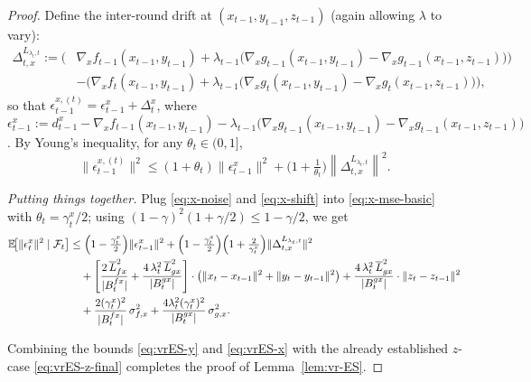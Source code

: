 \documentclass{uai2026} %
\newcommand{\EE}{\mathbb{E}}
\newcommand{\F}{\mathcal{F}}
\begin{document}
\begin{proof}
Define the inter-round drift at $(x_{t-1},y_{t-1},z_{t-1})$ (again allowing $\lambda$ to vary):
\begin{align}
    \Delta_{t,x}^{L_{\lambda_{t},t}}:=\Big(&\nabla_x f_{t-1}(x_{t-1},y_{t-1})+\lambda_{t-1}\big(\nabla_x g_{t-1}(x_{t-1},y_{t-1})-\nabla_x g_{t-1}(x_{t-1},z_{t-1})\big)\Big)
\nonumber\\
&-\Big(\nabla_x f_t(x_{t-1},y_{t-1})+\lambda_{t-1}\big(\nabla_x g_t(x_{t-1},y_{t-1})-\nabla_x g_t(x_{t-1},z_{t-1})\big)\Big),
\end{align}
so that $\epsilon_{t-1}^{x,(t)}=\epsilon_{t-1}^x+\Delta_t^x$, where
$\epsilon_{t-1}^x:=d_{t-1}^x-\nabla_x f_{t-1}(x_{t-1},y_{t-1})
-\lambda_{t-1}\big(\nabla_x g_{t-1}(x_{t-1},y_{t-1})-\nabla_x g_{t-1}(x_{t-1},z_{t-1})\big)$.
By Young’s inequality, for any $\theta_t\in(0,1]$,
\begin{equation}\label{eq:x-shift}
\|\epsilon_{t-1}^{x,(t)}\|^2\le(1+\theta_t)\|\epsilon_{t-1}^x\|^2+\Big(1+\tfrac{1}{\theta_t}\Big)\left\|\Delta_{t,x}^{L_{\lambda_{t},t}}\right\|^2.
\end{equation}

\noindent\textit{Putting things together.}
Plug \eqref{eq:x-noise} and \eqref{eq:x-shift} into \eqref{eq:x-mse-basic} with $\theta_t=\gamma_t^x/2$; using
$(1-\gamma)^2(1+\gamma/2)\le 1-\gamma/2$, we get
\begin{align}
\EE\!\big[\|\epsilon_t^x\|^2\mid\F_t\big]
&\le \Big(1-\tfrac{\gamma_t^x}{2}\Big)\|\epsilon_{t-1}^x\|^2
+ \Big(1-\tfrac{\gamma_t^x}{2}\Big)\Big(1+\tfrac{2}{\gamma_t^x}\Big)\|\Delta_{t,x}^{L_{\lambda_{t},t}}\|^2\notag\\
&\quad + \left[\frac{2\,\overline L_{fx}^2}{|B_t^{fx}|}+\frac{4\,\lambda_t^2\,\overline L_{gx}^2}{|B_t^{gx}|}\right]\cdot\big(\|x_t-x_{t-1}\|^2+\|y_t-y_{t-1}\|^2\big)
+ \frac{4\,\lambda_t^2\,\overline L_{gx}^2}{|B_t^{gx}|}\cdot\|z_t-z_{t-1}\|^2\notag\\
&\quad + \frac{2(\gamma_t^x)^2}{|B_t^{fx}|}\,\sigma_{f,x}^2
+ \frac{4\lambda_t^2(\gamma_t^x)^2}{|B_t^{gx}|}\,\sigma_{g,x}^2.
\label{eq:vrES-x}
\end{align}

Combining the bounds \eqref{eq:vrES-y} and \eqref{eq:vrES-x} with the already established $z$-case \eqref{eq:vrES-z-final}
completes the proof of Lemma~\ref{lem:vr-ES}.

\end{proof}
\end{document}
